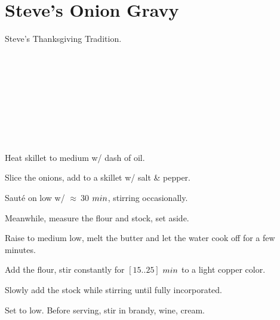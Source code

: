 \section[Steve's Onion Gravy]{Steve's Onion Gravy}

\begin{recipestats}[
        servings=3~C,
        preptime=10~\minute,
        bakingtime=60~\minute,
        original=Steven Teresi \& Gary Burgess,
    ]
\end{recipestats}

\begin{recipeabstract}
    Steve's Thanksgiving Tradition.

\end{recipeabstract}

\begin{ingredientcolumns}
    \begin{ingredientblock}
        \\
        \\
        \\
    \end{ingredientblock}
    \begin{ingredientblock}
        \\
        \\
        \\
        \\
    \end{ingredientblock}
\end{ingredientcolumns}

\begin{preparation}
\item Heat skillet to medium w/ dash of oil.
\item Slice the onions, add to a skillet w/ salt \& pepper.
\item Saut\'{e} on low w/ $\approx~30$ $\minute$, stirring occasionally.
\item Meanwhile, measure the flour and stock, set aside.
\item Raise to medium low, melt the butter and let the water cook off for a few minutes.
\item Add the flour, stir constantly for $[15..25]$ $\minute$ to a light copper color.
\item Slowly add the stock while stirring until fully incorporated.
\item Set to low.
    Before serving, stir in brandy, wine, cream.
\end{preparation}

\recipeend%
